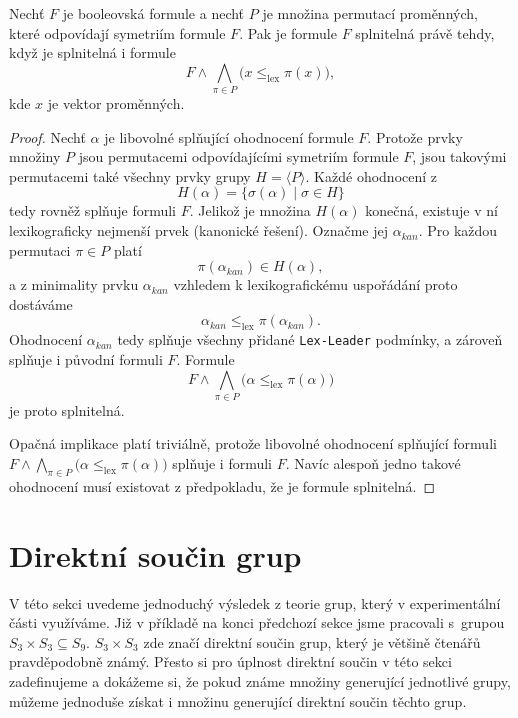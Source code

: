 \begin{lemma}
Nechť $F$ je booleovská formule a nechť $P$ je množina permutací proměnných, které odpovídají symetriím formule $F$. Pak je formule $F$ splnitelná právě tehdy, když je splnitelná i formule \[ F \land \bigwedge_{\pi \in P} \bigl( x \leq_{\mathrm{lex}} \pi(x) \bigr), \] kde $x$ je vektor proměnných.
\end{lemma}

\begin{proof} Nechť $\alpha$ je libovolné splňující ohodnocení formule $F$. Protože prvky množiny $P$ jsou permutacemi odpovídajícími symetriím formule $F$, jsou takovými permutacemi také všechny prvky grupy $H = \langle P \rangle$. Každé ohodnocení z \[ H(\alpha) = \{ \sigma(\alpha) \mid \sigma \in H \} \] tedy rovněž splňuje formuli $F$. Jelikož je množina $H(\alpha)$ konečná, existuje v ní lexikograficky nejmenší prvek (kanonické řešení). Označme jej $\alpha_{kan}$. Pro každou permutaci $\pi \in P$ platí \[ \pi(\alpha_{kan}) \in H(\alpha), \] a z minimality prvku $\alpha_{kan}$ vzhledem k lexikografickému uspořádání proto dostáváme \[ \alpha_{kan} \leq_{\mathrm{lex}} \pi(\alpha_{kan}). \] Ohodnocení $\alpha_{kan}$ tedy splňuje všechny přidané \texttt{Lex-Leader} podmínky, a zároveň splňuje i původní formuli $F$. Formule \[ F \land \bigwedge_{\pi \in P} \bigl( \alpha \leq_{\text{lex}} \pi(\alpha) \bigr) \] je proto splnitelná.

Opačná implikace platí triviálně, protože libovolné ohodnocení splňující formuli $F \land \bigwedge_{\pi \in P} \bigl( \alpha \leq_{\text{lex}} \pi(\alpha) \bigr)$ splňuje i formuli $F$. Navíc alespoň jedno takové ohodnocení musí existovat z předpokladu, že je formule splnitelná.
\end{proof}

\section{Direktní součin grup}
V této sekci uvedeme jednoduchý výsledek z teorie grup, který v experimentální části využíváme. Již v příkladě na konci předchozí sekce jsme pracovali s grupou  $S_3 \times S_3 \subseteq S_9$. $S_3 \times S_3$ zde značí direktní součin grup, který je většině čtenářů pravděpodobně známý. Přesto si pro úplnost direktní součin v této sekci zadefinujeme a dokážeme si, že pokud známe množiny generující jednotlivé grupy, můžeme jednoduše získat i množinu generující direktní součin těchto grup. 

